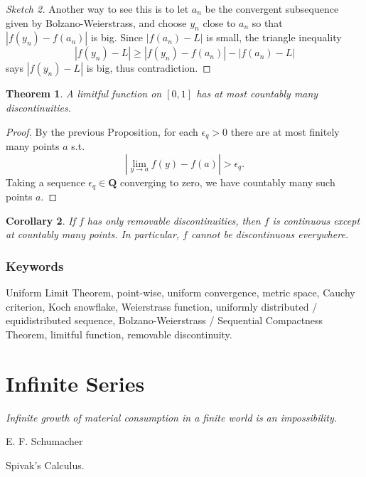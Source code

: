 \documentclass[12pt]{article}
\theoremstyle{plain}
\newtheorem{theorem}{Theorem}
\newtheorem{corollary}[theorem]{Corollary}
\theoremstyle{definition}
\theoremstyle{remark}
\newcommand{\Q}{\mathbf Q}
\begin{document}
\begin{proof}[Sketch 2]
Another way to see this is to let $a_n$ be the convergent subsequence given by Bolzano-Weierstrass, and choose $y_n$ close to $a_n$ so that $|f(y_n) - f(a_n)|$ is big. Since $|f(a_n) - L|$ is small, the triangle inequality 
$$|f(y_n) - L| \geq |f(y_n) - f(a_n)| - |f(a_n) - L|$$ 
says $|f(y_n) - L|$ is big, thus contradiction.
\end{proof}

\begin{theorem}
A limitful function on $[0, 1]$ has at most countably many discontinuities.
\end{theorem}

\begin{proof}
By the previous Proposition, for each $\epsilon_q > 0$ there are at most finitely many points $a$ s.t. $$|\lim\limits_{y\to a} f(y) - f(a)| > \epsilon_q.$$ Taking a sequence $\epsilon_q \in \Q$ converging to zero, we have countably many such points $a$.
\end{proof}

\begin{corollary}
If $f$ has only removable discontinuities, then $f$ is continuous except at countably many points. In particular, $f$ cannot be discontinuous everywhere.
\end{corollary}

\section{Keywords}

Uniform Limit Theorem, point-wise, uniform convergence, metric space, Cauchy criterion, Koch snowflake, Weierstrass function, uniformly distributed / equidistributed sequence, Bolzano-Weierstrass / Sequential Compactness Theorem, limitful function, removable discontinuity.

\part{Infinite Series}

\epigraph{\textit{Infinite growth of material consumption in a finite world is an impossibility.}}{E. F. Schumacher}

\begin{thebibliography}{99}

 Spivak's Calculus.

\end{thebibliography}
\end{document}
